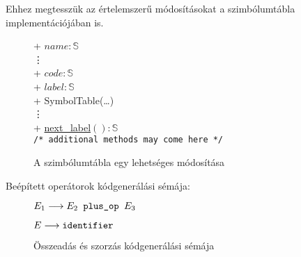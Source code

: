 Ehhez megtesszük az értelemszerű módosításokat a szimbólumtábla implementációjában is.

\begin{figure}[h]
	\centering
	
	+ $name : \mathbb{S}$ \\
	\vdots \\
	+ $code : \mathbb{S}$ \\
	+ $label : \mathbb{S}$ \\
	\hline
	+ SymbolTable(\dots) \\
	\vdots \\
	+ \underline{next\_label$():\mathbb{S}$} \\ 
	\texttt{/* additional methods may come here */} \\
	\eoStruct
	\caption{A szimbólumtábla egy lehetséges módosítása}
\end{figure}

Beépített operátorok kódgenerálási sémája:

\begin{figure}[h]
	\begin{minipage}{0.5\linewidth}
		\begin{stuki*}[5cm]{$E_1 \longrightarrow E_2 \texttt{ plus\_op } E_3$}
		\end{stuki*}
	\end{minipage}
	\begin{minipage}{0.5\linewidth}
		\begin{stuki*}[5cm]{$E \longrightarrow \texttt{identifier}$}
		\end{stuki*}
	\end{minipage}
	\caption{Összeadás és szorzás kódgenerálási sémája}
\end{figure}

